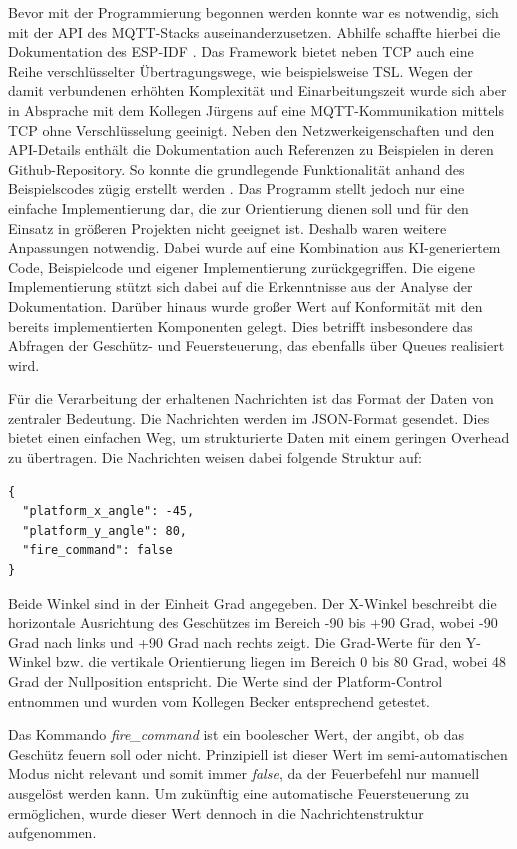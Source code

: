 Bevor mit der Programmierung begonnen werden konnte war es notwendig, sich mit der API des MQTT-Stacks auseinanderzusetzen. Abhilfe schaffte hierbei die Dokumentation des ESP-IDF \cite{esp32_mqtt}. Das Framework bietet neben TCP auch eine Reihe verschlüsselter Übertragungswege, wie beispielsweise TSL. Wegen der damit verbundenen erhöhten Komplexität und Einarbeitungszeit wurde sich aber in Absprache mit dem Kollegen Jürgens auf eine MQTT-Kommunikation mittels TCP ohne Verschlüsselung geeinigt. Neben den Netzwerkeigenschaften und den API-Details enthält die Dokumentation auch Referenzen zu Beispielen in deren Github-Repository. So konnte die grundlegende Funktionalität anhand des Beispielscodes zügig erstellt werden \cite{esp32_mqtt_example}. Das Programm stellt jedoch nur eine einfache Implementierung dar, die zur Orientierung dienen soll und für den Einsatz in größeren Projekten nicht geeignet ist. Deshalb waren weitere Anpassungen notwendig. Dabei wurde auf eine Kombination aus KI-generiertem Code, Beispielcode und eigener Implementierung zurückgegriffen. Die eigene Implementierung stützt sich dabei auf die Erkenntnisse aus der Analyse der Dokumentation. Darüber hinaus wurde großer Wert auf Konformität mit den bereits implementierten Komponenten gelegt. Dies betrifft insbesondere das Abfragen der Geschütz- und Feuersteuerung, das ebenfalls über Queues realisiert wird. \newline

Für die Verarbeitung der erhaltenen Nachrichten ist das Format der Daten von zentraler Bedeutung. Die Nachrichten werden im JSON-Format gesendet. Dies bietet einen einfachen Weg, um strukturierte Daten mit einem geringen Overhead zu übertragen. Die Nachrichten weisen dabei folgende Struktur auf:

\begin{lstlisting}
{
  "platform_x_angle": -45,
  "platform_y_angle": 80,
  "fire_command": false
}
\end{lstlisting}

Beide Winkel sind in der Einheit Grad angegeben. Der X-Winkel beschreibt die horizontale Ausrichtung des Geschützes im Bereich -90 bis +90 Grad, wobei -90 Grad nach links und +90 Grad nach rechts zeigt. Die Grad-Werte für den Y-Winkel bzw. die vertikale Orientierung liegen im Bereich 0 bis 80 Grad, wobei 48 Grad der Nullposition entspricht. Die Werte sind der Platform-Control entnommen und wurden vom Kollegen Becker entsprechend getestet. \newline

Das Kommando \textit{fire\_command} ist ein boolescher Wert, der angibt, ob das Geschütz feuern soll oder nicht. Prinzipiell ist dieser Wert im semi-automatischen Modus nicht relevant und somit immer \textit{false}, da der Feuerbefehl nur manuell ausgelöst werden kann. Um zukünftig eine automatische Feuersteuerung zu ermöglichen, wurde dieser Wert dennoch in die Nachrichtenstruktur aufgenommen. \newline

